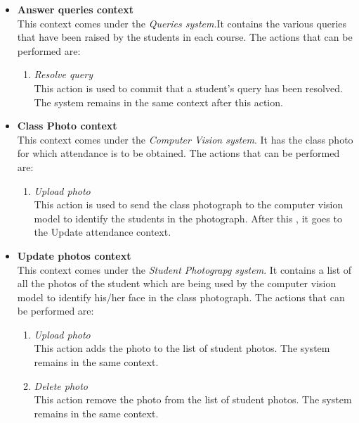 \documentclass[paper=a4, fontsize=15pt]{scrartcl}
\begin{document}
\begin{itemize}
   \item \textbf{Answer queries context}\\
   This context comes under the \textit{Queries system}.It contains the various queries that have been raised by the students in each course. The actions that can be performed are:
   \begin{enumerate}
       \item \textit{Resolve query}\\
       This action is used to commit that a student's query has been resolved. The system remains in the same context after this action.
   \end{enumerate}
   
   \item \textbf{ Class Photo context}\\
   This context comes under the \textit{Computer Vision system}. It has the class photo for which attendance is to be obtained. The actions that can be performed are:
   \begin{enumerate}
        \item \textit{Upload photo}\\
        This action is used to send the class photograph to the computer vision model to identify the students in the photograph. After this , it goes to the Update attendance context.
        
    \end{enumerate}
    
    \item \textbf{Update photos context}\\
    This context comes under the \textit{Student Photograpg system}. It contains a list of all the photos of the student which are being used by the computer vision model to identify his/her face in the class photograph. The actions that can be performed are:
   \begin{enumerate}
        \item \textit{Upload photo}\\
        This action adds the photo to the list of student photos. The system remains in the same context.
        
        \item \textit{Delete photo}\\
        This action remove the photo from the list of student photos. The system remains in the same context.
        
    \end{enumerate}
    

\end{itemize}
\end{document}

